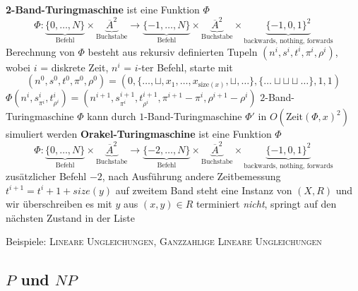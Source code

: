 \begin{outline}
    \1 \textbf{2-Band-Turingmaschine} ist eine Funktion $\Phi$
    $$
    \Phi: \underbrace{\{0,\ldots, N\}}_{\text{Befehl}} 
    \times \underbrace{\overline{A}^2}_{\text{Buchstabe}} 
    \longrightarrow 
    \underbrace{\{-1,\ldots,N\}}_{\text{Befehl}} 
    \times \underbrace{\overline{A}^2}_{\text{Buchstabe}} 
    \times \underbrace{\{-1,0,1\}^2}_{\text{backwards, nothing, forwards}} 
    $$
        \2 Berechnung von $\Phi$ besteht aus rekursiv definierten Tupeln $(n^i,s^i,t^i,\pi^i,\rho^i)$, wobei
            \3 $i$ = diskrete Zeit, $n^i$ = $i$-ter Befehl, 
            \3 starte mit 
            $$(n^0,s^0,t^0,\pi^0,\rho^0)=(0,\{\ldots,\sqcup,x_1,\ldots,x_{\text{size}(x)},\sqcup,\ldots\},\{\ldots\sqcup\sqcup\sqcup\ldots\},1,1)$$
            \3 $\Phi(n^i,s^i_{\pi^i},t^i_{\rho^i})=(n^{i+1},s^{i+1}_{\pi^i},t^{i+1}_{\rho^i},\pi^{i+1}-\pi^i,\rho^{i+1}-\rho^i)$
    \1 $2$-Band-Turingmaschine $\Phi$ kann durch $1$-Band-Turingmaschine $\Phi'$ in $O(\text{Zeit}(\Phi,x)^2)$ simuliert werden
    \1 \textbf{Orakel-Turingmaschine} ist eine Funktion $\Phi$
    $$
    \Phi: \underbrace{\{0,\ldots, N\}}_{\text{Befehl}} 
    \times \underbrace{\overline{A}^2}_{\text{Buchstabe}} 
    \longrightarrow 
    \underbrace{\{-2,\ldots,N\}}_{\text{Befehl}} 
    \times \underbrace{\overline{A}^2}_{\text{Buchstabe}} 
    \times \underbrace{\{-1,0,1\}^2}_{\text{backwards, nothing, forwards}} 
    $$
        \2 zusätzlicher Befehl $-2$, nach Ausführung andere Zeitbemessung $t^{i+1}=t^i+1+size(y)$
        \2 auf zweitem Band steht eine Instanz von $(X,R)$ und wir überschreiben es mit $y$ aus $(x,y)\in R$
        \2 terminiert \textit{nicht}, springt auf den nächsten Zustand in der Liste

    \1 Beispiele: \textsc{Lineare Ungleichungen}, \textsc{Ganzzahlige Lineare Ungleichungen}
\end{outline}

\subsection{$P$ und $NP$}


